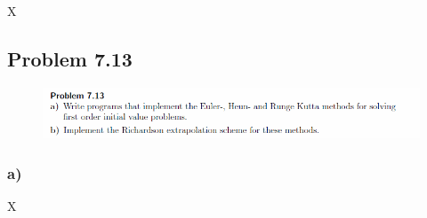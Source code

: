 X






\subsection{Problem 7.13}


\begin{figure}[!ht]
\includegraphics[width=1\textwidth]{chapters/images/desc-7-13}
\end{figure}



\subsubsection{a)}

X

